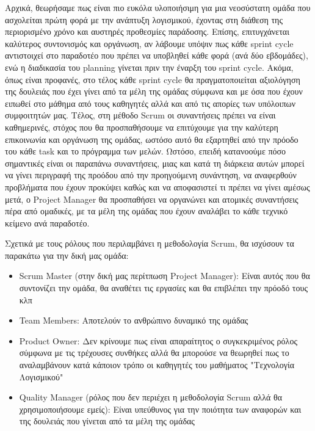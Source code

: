 \documentclass{article}
\begin{document}
Αρχικά, θεωρήσαμε πως είναι πιο ευκόλα υλοποιήσιμη για μια νεοσύστατη ομάδα που ασχολείται πρώτη φορά με την ανάπτυξη λογισμικού, έχοντας στη διάθεση της περιορισμένο χρόνο και αυστηρές προθεσμίες παράδοσης. Επίσης, επιτυγχάνεται καλύτερος συντονισμός και οργάνωση, αν λάβουμε υπόψιν πως κάθε sprint cycle αντιστοιχεί στο παραδοτέο που πρέπει να υποβληθεί κάθε φορά (ανά δύο εβδομάδες), ενώ η διαδικασία του planning γίνεται πριν την έναρξη του sprint cycle. Ακόμα, όπως είναι προφανές, στο τέλος κάθε sprint cycle θα πραγματοποιείται αξιολόγηση της δουλειάς που έχει γίνει από τα μέλη της ομάδας σύμφωνα και με όσα που έχουν ειπωθεί στο μάθημα από τους καθηγητές αλλά και από τις απορίες των υπόλοιπων συμφοιτητών μας. Τέλος, στη μέθοδο Scrum οι συναντήσεις πρέπει να είναι καθημερινές, στόχος που θα προσπαθήσουμε να επιτύχουμε για την καλύτερη επικοινωνία και οργάνωση της ομάδας, ωστόσο αυτό θα εξαρτηθεί από την πρόοδο του κάθε task και το πρόγραμμα των μελών. Ωστόσο, επειδή κατανοούμε πόσο σημαντικές είναι οι παραπάνω συναντήσεις, μιας και κατά τη διάρκεια αυτών μπορεί να γίνει περιγραφή της προόδου από την προηγούμενη συνάντηση, να αναφερθούν προβλήματα που έχουν προκύψει καθώς και να αποφασιστεί τι πρέπει να γίνει αμέσως μετά, ο Project Manager θα προσπαθήσει να οργανώνει και ατομικές συναντήσεις πέρα από ομαδικές, με τα μέλη της ομάδας που έχουν αναλάβει το κάθε τεχνικό κείμενο ανά παραδοτέο. \newline \par

Σχετικά με τους ρόλους που περιλαμβάνει η μεθοδολογία Scrum, θα ισχύσουν τα παρακάτω για την δική μας ομάδα:

\begin{itemize}
  \item Scrum Master (στην δική μας περίτπωση Project Manager): Είναι αυτός που θα συντονίζει την ομάδα, θα αναθέτει τις εργασίες και θα επιβλέπει την πρόοδό τους κλπ
  \item Team Members: Αποτελούν το ανθρώπινο δυναμικό της ομάδας
  \item Product Owner: Δεν κρίνουμε πως είναι απαραίτητος ο συγκεκριμένος ρόλος σύμφωνα με τις τρέχουσες συνθήκες αλλά θα μπορούσε να θεωρηθεί πως το αναλαμβάνουν κατά κάποιον τρόπο οι καθηγητές του μαθήματος "Τεχνολογία Λογισμικού"
  \item Quality Manager (ρόλος που δεν περιέχει η μεθοδολογία Scrum αλλά θα χρησιμοποιήσουμε εμείς): Είναι υπεύθυνος για την ποιότητα των αναφορών και της δουλειάς που γίνεται από τα μέλη της ομάδας
\end{itemize}
\end{document}
